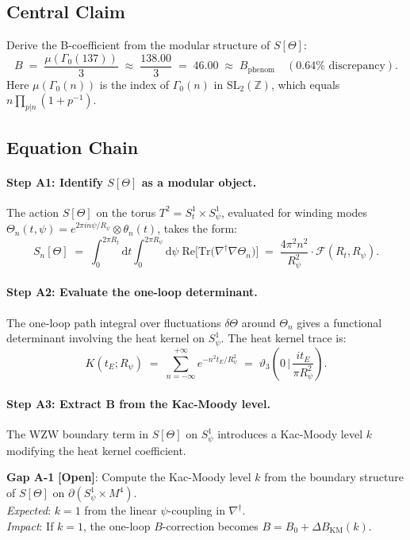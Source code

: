 \documentclass[12pt,a4paper]{article}
\theoremstyle{definition}
\theoremstyle{remark}
\newcommand{\ZZ}{\mathbb{Z}}
\newcommand{\Tr}{\mathrm{Tr}}
\newcommand{\re}{\mathrm{Re}}
\newcommand{\OPEN}{\textbf{[Open]}}
\begin{document}
\subsection{Central Claim}

\begin{tcolorbox}[colback=green!4!white,colframe=green!60!black,
  title=Route A Target]
Derive the B-coefficient from the modular structure of $S[\Theta]$:
\[
  B \;=\; \frac{\mu(\Gamma_0(137))}{3}
        \;\approx\; \frac{138.00}{3}
        \;=\; 46.00
        \;\approx\; B_{\mathrm{phenom}} \quad (0.64\%\text{ discrepancy}).
\]
Here $\mu(\Gamma_0(n))$ is the index of $\Gamma_0(n)$ in $\mathrm{SL}_2(\ZZ)$,
which equals $n\prod_{p|n}(1+p^{-1})$.
\end{tcolorbox}

\subsection{Equation Chain}

\paragraph{Step A1: Identify $S[\Theta]$ as a modular object.}
The action $S[\Theta]$ on the torus $T^2 = S^1_t \times S^1_\psi$,
evaluated for winding modes $\Theta_n(t,\psi) = e^{2\pi i n\psi/R_\psi} \otimes \theta_n(t)$,
takes the form:
\[
  S_n[\Theta]
  \;=\;
  \int_0^{2\pi R_t}\!\mathrm{d}t
  \int_0^{2\pi R_\psi}\!\mathrm{d}\psi\;
  \re\bigl[\Tr\bigl(\nabla^\dagger\nabla\Theta_n\bigr)\bigr]
  \;=\;
  \frac{4\pi^2 n^2}{R_\psi^2}\cdot\mathcal{F}(R_t,R_\psi).
\]

\paragraph{Step A2: Evaluate the one-loop determinant.}
The one-loop path integral over fluctuations $\delta\Theta$ around $\Theta_n$
gives a functional determinant involving the heat kernel on $S^1_\psi$.
The heat kernel trace is:
\[
  K(t_E;R_\psi)
  \;=\;
  \sum_{n=-\infty}^{+\infty} e^{-n^2 t_E / R_\psi^2}
  \;=\;
  \vartheta_3\!\left(0\,\big|\,\frac{it_E}{\pi R_\psi^2}\right).
\]

\paragraph{Step A3: Extract B from the Kac-Moody level.}
The WZW boundary term in $S[\Theta]$ on $S^1_\psi$ introduces a Kac-Moody level
$k$ modifying the heat kernel coefficient.
\begin{mdframed}[backgroundcolor=yellow!15]
\textbf{Gap A-1} \OPEN: Compute the Kac-Moody level $k$ from the boundary
structure of $S[\Theta]$ on $\partial(S^1_\psi \times M^4)$.\\
\textit{Expected}: $k = 1$ from the linear $\psi$-coupling in $\nabla^\dagger$.\\
\textit{Impact}: If $k = 1$, the one-loop $B$-correction becomes
$B = B_0 + \Delta B_{\mathrm{KM}}(k)$.
\end{mdframed}
\end{document}
